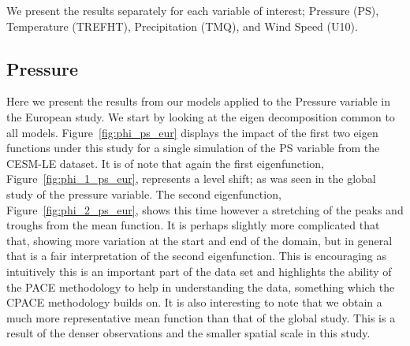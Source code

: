 We present the results separately for each variable of interest; Pressure (PS), Temperature (TREFHT), Precipitation (TMQ), and Wind Speed (U10).

\subsection{Pressure \label{ssec:cesm_ps_eur}}
Here we present the results from our models applied to the Pressure variable in the European study.
We start by looking at the eigen decomposition common to all models.
Figure~\ref{fig:phi_ps_eur} displays the impact of the first two eigen functions under this study for a single simulation of the PS variable from the CESM-LE dataset.
It is of note that again the first eigenfunction, Figure~\ref{fig:phi_1_ps_eur}, represents a level shift; as was seen in the global study of the pressure variable.
The second eigenfunction, Figure~\ref{fig:phi_2_ps_eur}, shows this time however a stretching of the peaks and troughs from the mean function.
It is perhaps slightly more complicated that that,  showing more variation at the start and end of the domain, but in general that is a fair interpretation of the second eigenfunction.
This is encouraging as intuitively this is an important part of the data set and highlights the ability of the PACE methodology to help in understanding the data, something which the CPACE methodology builds on.
It is also interesting to note that we obtain a much more representative mean function than that of the global study.
This is a result of the denser observations and the smaller spatial scale in this study.

